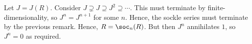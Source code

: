 Let $J = J(R)$. Consider
$J \supsetneq J \supseteq J^2 \supseteq \cdots$. This must terminate by
finite-dimensionality, so  $J^n = J^{n+1}$ for some $n$. Hence, the sockle
series must terminate by the previous remark. Hence, $R = \soc_n(R)$. But then
$J^n$ annihilates $1$, so $J^n = 0$ as required.
